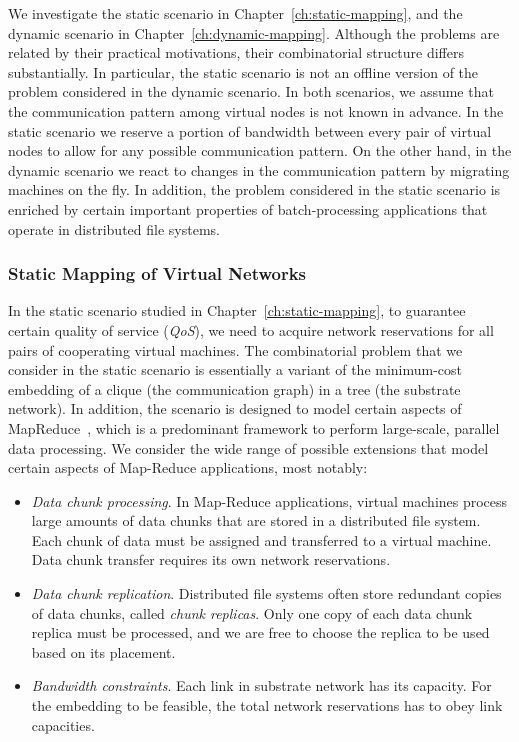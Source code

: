 We investigate the static scenario in Chapter~\ref{ch:static-mapping}, and the dynamic scenario in Chapter~\ref{ch:dynamic-mapping}.
Although the problems are related by their practical motivations, their combinatorial structure differs substantially.
In particular, the static scenario is not an offline version of the problem considered in the dynamic scenario.
In both scenarios, we assume that the communication pattern among virtual nodes is not known in advance.
In the static scenario we reserve a portion of bandwidth between every pair of virtual nodes to allow for any possible communication pattern.
On the other hand, in the dynamic scenario we react to changes in the communication pattern by migrating machines on the fly.
In addition, the problem considered in the static scenario is enriched by certain important properties of batch-processing applications that operate in distributed file systems.


\subsubsection{Static Mapping of Virtual Networks}
\label{sec:contributions-static-mapping}

In the static scenario studied in Chapter~\ref{ch:static-mapping}, to guarantee certain quality of service (\emph{QoS}), we need to acquire network reservations for all pairs of cooperating virtual machines.
The combinatorial problem that we consider in the static scenario is essentially a variant of the minimum-cost embedding of a clique (the communication graph) in a tree (the substrate network).
In addition, the scenario is designed to model certain aspects of MapReduce~\cite{mapreduce}, which is a predominant framework to perform large-scale, parallel data processing.
We consider the wide range of possible extensions that model certain aspects of Map-Reduce applications, most notably:

\begin{itemize}
\item \emph{Data chunk processing}. In Map-Reduce applications, virtual machines process large amounts of data chunks that are stored in a distributed file system. Each chunk of data must be assigned and transferred to a virtual machine. Data chunk transfer requires its own network reservations.

\item \emph{Data chunk replication}. Distributed file systems often store redundant copies of data chunks, called \emph{chunk replicas}. Only one copy of each data chunk replica must be processed, and we are free to choose the replica to be used based on its placement.

\item \emph{Bandwidth constraints}. Each link in substrate network has its capacity. For the embedding to be feasible, the total network reservations has to obey link capacities.
\end{itemize}


